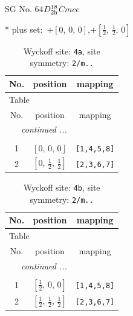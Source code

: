 \documentclass[fleqn,8pt]{jsarticle}
\begin{document}
\setcounter{MaxMatrixCols}{32}

\renewcommand{\tablename}{Table~}
\renewcommand{\figurename}{Figure~}
\begin{center}
\LARGE
SG No. 64\quad$D_{\rm 2h}^{18}$\quad$Cmce$\quad[ orthorhombic ]
\end{center}
* plus set:\,\,\,$+\left[ 0,\, 0,\, 0 \right]$,\quad $+\left[ \frac{1}{2},\, \frac{1}{2},\, 0 \right]$
\renewcommand{\arraystretch}{1.2}
\begin{longtable}{ccc}
\caption{Wyckoff site: {\tt 4a}, site symmetry: {\tt 2/m..}}
 \\
 \hline \hline
No. & position & mapping \\ \hline \endfirsthead

\multicolumn{2}{l}{\tablename\ \thetable{}} \\
 \hline \hline
No. & position & mapping \\ \hline \endhead

 \hline \hline
\multicolumn{2}{r}{\footnotesize\it continued ...} \\ \endfoot

 \hline \hline
\multicolumn{2}{r}{} \\ \endlastfoot

1 & $\left[ 0,\, 0,\, 0 \right]$ & {\tt [1,4,5,8]} \\ \hline
2 & $\left[ 0,\, \frac{1}{2},\, \frac{1}{2} \right]$ & {\tt [2,3,6,7]} \\
\end{longtable}
\renewcommand{\arraystretch}{1.2}
\begin{longtable}{ccc}
\caption{Wyckoff site: {\tt 4b}, site symmetry: {\tt 2/m..}}
 \\
 \hline \hline
No. & position & mapping \\ \hline \endfirsthead

\multicolumn{2}{l}{\tablename\ \thetable{}} \\
 \hline \hline
No. & position & mapping \\ \hline \endhead

 \hline \hline
\multicolumn{2}{r}{\footnotesize\it continued ...} \\ \endfoot

 \hline \hline
\multicolumn{2}{r}{} \\ \endlastfoot

1 & $\left[ \frac{1}{2},\, 0,\, 0 \right]$ & {\tt [1,4,5,8]} \\ \hline
2 & $\left[ \frac{1}{2},\, \frac{1}{2},\, \frac{1}{2} \right]$ & {\tt [2,3,6,7]} \\
\end{longtable}
\end{document}

